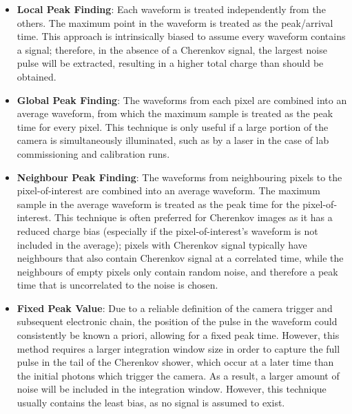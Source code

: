 \begin{itemize}
	\item \textbf{Local Peak Finding}: Each waveform is treated independently from the others. The maximum point in the waveform is treated as the peak/arrival time. This approach is intrinsically biased to assume every waveform contains a signal; therefore, in the absence of a Cherenkov signal, the largest noise pulse will be extracted, resulting in a higher total charge than should be obtained.
	\item \textbf{Global Peak Finding}: The waveforms from each pixel are combined into an average waveform, from which the maximum sample is treated as the peak time for every pixel. This technique is only useful if a large portion of the camera is simultaneously illuminated, such as by a laser in the case of lab commissioning and calibration runs.
	\item \textbf{Neighbour Peak Finding}: The waveforms from neighbouring pixels to the pixel-of-interest are combined into an average waveform. The maximum sample in the average waveform is treated as the peak time for the pixel-of-interest. This technique is often preferred for Cherenkov images as it has a reduced charge bias (especially if the pixel-of-interest's waveform is not included in the average); pixels with Cherenkov signal typically have neighbours that also contain Cherenkov signal at a correlated time, while the neighbours of empty pixels only contain random noise, and therefore a peak time that is uncorrelated to the noise is chosen.
	\item \textbf{Fixed Peak Value}: Due to a reliable definition of the camera trigger and subsequent electronic chain, the position of the pulse in the waveform could consistently be known a priori, allowing for a fixed peak time. However, this method requires a larger integration window size in order to capture the full pulse in the tail of the Cherenkov shower, which occur at a later time than the initial photons which trigger the camera. As a result, a larger amount of noise will be included in the integration window. However, this technique usually contains the least bias, as no signal is assumed to exist.
\end{itemize}


